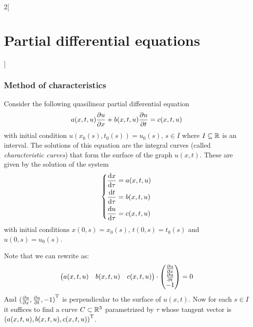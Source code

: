 \documentclass[../../../main_math.tex]{subfiles}
\begin{document}
\begin{multicols}{2}[\section{Partial differential equations}]
  \subsubsection{Method of characteristics}
  \begin{proposition}
    Consider the following quasilinear partial differential equation
    \begin{equation}\label{PDE:char}
      a(x,t,u)\pdv{u}{x}+b(x,t,u)\pdv{u}{t}=c(x,t,u)
    \end{equation}
    with initial condition $u(x_0(s),t_0(s))=u_0(s)$, $s\in I$ where $I\subseteq \mathbb{R}$ is an interval. The solutions of this equation are the integral curves (called \emph{characteristic curves}) that form the surface of the graph $u(x,t)$. These are given by the solution of the system
    \begin{equation*}
      \left\{
      \begin{aligned}
        \dv{x}{\tau} & = a(x,t,u) \\
        \dv{t}{\tau} & = b(x,t,u) \\
        \dv{u}{\tau} & = c(x,t,u) \\
      \end{aligned}
      \right.
    \end{equation*}
    with initial conditions $x(0,s)=x_0(s)$, $t(0,s)=t_0(s)$ and $u(0,s)=u_0(s)$.
  \end{proposition}
  \begin{sproof}
    Note that we can rewrite  as: $$\begin{pmatrix}
        a(x,t,u) & b(x,t,u) & c(x,t,u)
      \end{pmatrix}\cdot\begin{pmatrix}
        \pdv{u}{x} \\
        \pdv{u}{t} \\
        -1
      \end{pmatrix}=0$$
    And ${(\pdv{u}{x},\pdv{u}{t}, -1)}^{\mathrm{T}}$ is perpendicular to the surface of $u(x,t)$. Now for each $s\in I$ it suffices to find a curve $C\subset\mathbb{R}^3$ parametrized by $\tau$ whose tangent vector is ${(a(x,t,u), b(x,t,u), c(x,t,u))}^{\mathrm{T}}$.
  \end{sproof}

\end{multicols}
\end{document}
